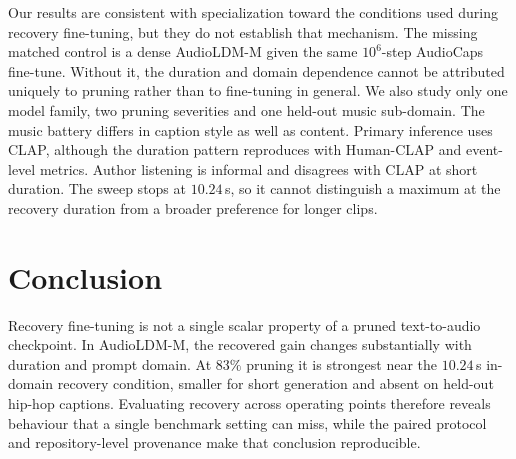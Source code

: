 Our results are consistent with specialization toward the conditions used during recovery fine-tuning, but they do not establish that mechanism. The missing matched control is a dense AudioLDM-M given the same $10^{6}$-step AudioCaps fine-tune. Without it, the duration and domain dependence cannot be attributed uniquely to pruning rather than to fine-tuning in general. We also study only one model family, two pruning severities and one held-out music sub-domain. The music battery differs in caption style as well as content. Primary inference uses CLAP, although the duration pattern reproduces with Human-CLAP and event-level metrics. Author listening is informal and disagrees with CLAP at short duration. The sweep stops at $10.24$\,s, so it cannot distinguish a maximum at the recovery duration from a broader preference for longer clips.

\section{Conclusion}
Recovery fine-tuning is not a single scalar property of a pruned text-to-audio checkpoint. In AudioLDM-M, the recovered gain changes substantially with duration and prompt domain. At $83\%$ pruning it is strongest near the $10.24$\,s in-domain recovery condition, smaller for short generation and absent on held-out hip-hop captions. Evaluating recovery across operating points therefore reveals behaviour that a single benchmark setting can miss, while the paired protocol and repository-level provenance make that conclusion reproducible.

